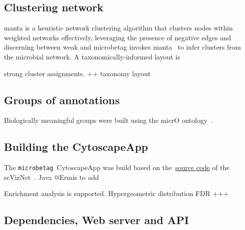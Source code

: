 \documentclass[sn-mathphys,Numbered, lineno]{sn-jnl}  %
\theoremstyle{thmstyleone}%
\theoremstyle{thmstyletwo}%
\theoremstyle{thmstylethree}%
\newcommand{\microbetag}{\texttt{microbetag }}
\begin{document}
    \subsection*{ Clustering network  }
    \label{subsec:mant}

        manta is a heuristic network clustering algorithm that clusters nodes within weighted networks effectively, leveraging the presence of negative edges and discerning between weak and 
        microbetag invokes manta~\cite{rottjers2020manta} to infer clusters from the microbial network.
        A taxonomically-informed layout is 

        strong cluster assignments.
        ++ taxonomy layout 
        




    \subsection*{ Groups of annotations }
    \label{groups}

        Biologically meaningful groups were built using the micrO ontology~\cite{blank2016micro}.





    \subsection*{ Building the CytoscapeApp }
    \label{subsec:build-cytoapp}

        The \microbetag CytoscapeApp was build based on the~\href{https://github.com/RBVI/scNetViz}{source code} of the scVizNet~\cite{choudhary2021scnetviz}.
        Java 
        @Ermis to add 
        

        Enrichment analysis is supported. 
        Hypergeometric distribution
        FDR +++




    \subsection*{ Dependencies, Web server and API }
    \label{subsec:webserver}
\end{document}
